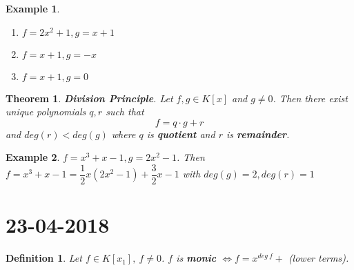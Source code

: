 \documentclass[a4paper,10pt]{article}
\newtheorem{theo}{Theorem}
\newtheorem{defi}{Definition}
\newtheorem{ex}{Example}
\begin{document}
\begin{ex}
	\begin{enumerate}
		\item $ f=2x^2 +1 , g =x+1 $
		\item  $ f=x+1, g=-x $
		\item  $ f=x+1, g =0 $
	\end{enumerate}
\end{ex}

\begin{theo}
	\textbf{Division Principle}. Let $ f,g \in K[x] $ and $ g \neq 0 $. Then there exist unique polynomials $ q,r $ such that
	\[ f= q \cdot g + r  \] and $ deg(r) < deg(g) $ where $ q $ is \textbf{quotient} and $ r $ is \textbf{remainder}.
\end{theo}

\begin{ex}
	$ f = x^3 +x -1 , g =2x^2 -1 $. Then $ f = x^3+x-1 = \dfrac{1}{2} x (2x^2-1) + \dfrac{3}{2}x -1 $ with $ deg(g)=2 , deg(r)=1 $
\end{ex}

\newpage
\section{23-04-2018}

\begin{defi}
	Let $ f \in K[x_{1}] , \  f\neq 0 $. $ f $ is \textbf{monic} $ \Leftrightarrow f = x^{deg \ f} + $ (lower terms).
\end{defi}
\end{document}
